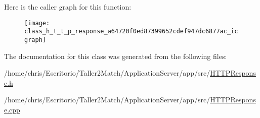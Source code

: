 Here is the caller graph for this function\+:
\nopagebreak
\begin{figure}[H]
\begin{center}
\leavevmode
\texttt{[image: class\_h\_t\_t\_p\_response\_a64720f0ed87399652cdef947dc6877ac\_icgraph]}
\end{center}
\end{figure}




The documentation for this class was generated from the following files\+:\begin{DoxyCompactItemize}
\item 
/home/chris/\+Escritorio/\+Taller2\+Match/\+Application\+Server/app/src/\hyperlink{_h_t_t_p_response_8h}{H\+T\+T\+P\+Response.\+h}\item 
/home/chris/\+Escritorio/\+Taller2\+Match/\+Application\+Server/app/src/\hyperlink{_h_t_t_p_response_8cpp}{H\+T\+T\+P\+Response.\+cpp}\end{DoxyCompactItemize}
